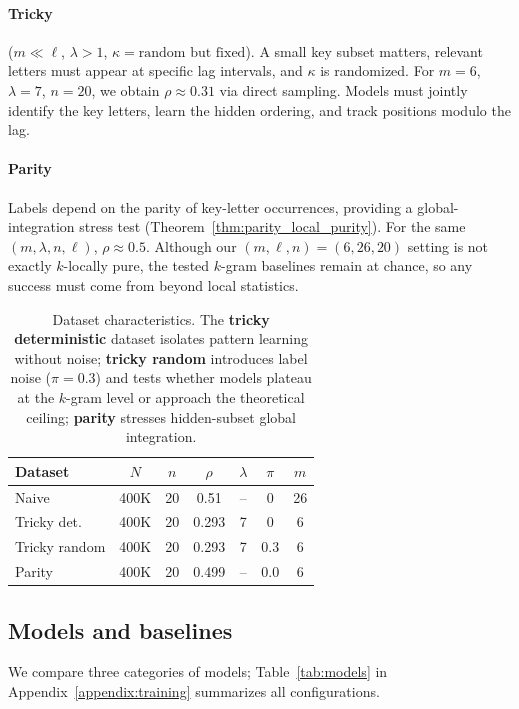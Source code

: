 \documentclass{article}
\theoremstyle{plain}
\theoremstyle{definition}
\theoremstyle{remark}
\begin{document}
\paragraph{Tricky} ($m \ll \ell$, $\lambda > 1$, $\kappa = \text{random but fixed}$).
A small key subset matters, relevant letters must appear at specific lag intervals, and $\kappa$ is randomized. For $m=6$, $\lambda=7$, $n=20$, we obtain $\rho \approx 0.31$ via direct sampling. Models must jointly identify the key letters, learn the hidden ordering, and track positions modulo the lag.

\paragraph{Parity} Labels depend on the parity of key-letter occurrences, providing a global-integration stress test (Theorem~\ref{thm:parity_local_purity}). For the same $(m,\lambda,n,\ell)$, $\rho \approx 0.5$. Although our $(m,\ell,n)=(6,26,20)$ setting is not exactly $k$-locally pure, the tested $k$-gram baselines remain at chance, so any success must come from beyond local statistics.

\begin{table}[t]
\centering
\caption{Dataset characteristics. The \textbf{tricky deterministic} dataset isolates pattern learning without noise; \textbf{tricky random} introduces label noise ($\pi=0.3$) and tests whether models plateau at the $k$-gram level or approach the theoretical ceiling; \textbf{parity} stresses hidden-subset global integration.}
\label{tab:datasets}
\begin{tabular}{lcccccc}
\toprule
Dataset & $N$ & $n$ & $\rho$ & $\lambda$ & $\pi$ & $m$ \\
\midrule
Naive & 400K  & 20 & 0.51 & -- & 0 & 26\\
Tricky det. & 400K & 20 & 0.293 & 7 & 0 & 6\\
Tricky random & 400K & 20 & 0.293 & 7 & 0.3 & 6 \\
Parity & 400K & 20 & 0.499 & -- & 0.0 & 6\\
\bottomrule
\end{tabular}
\end{table}

\subsection{Models and baselines}
\label{subsec:models}

We compare three categories of models; Table~\ref{tab:models} in Appendix~\ref{appendix:training} summarizes all configurations.
\end{document}
